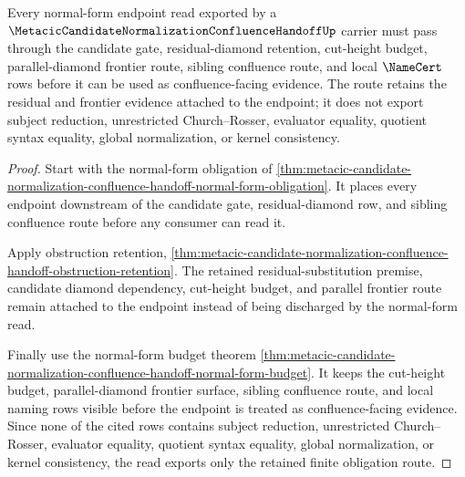\begin{theorem}
\label{thm:metacic-candidate-normalization-normal-form-obligation-route}
Every normal-form endpoint read exported by a
$\MetacicCandidateNormalizationConfluenceHandoffUp$ carrier must pass through
the candidate gate, residual-diamond retention, cut-height budget,
parallel-diamond frontier route, sibling confluence route, and local
$\NameCert$ rows before it can be used as confluence-facing evidence. The route
retains the residual and frontier evidence attached to the endpoint; it does not
export subject reduction, unrestricted Church--Rosser, evaluator equality,
quotient syntax equality, global normalization, or kernel consistency.
\end{theorem}
\begin{proof}
Start with the normal-form obligation of
\autoref{thm:metacic-candidate-normalization-confluence-handoff-normal-form-obligation}.
It places every endpoint downstream of the candidate gate, residual-diamond row,
and sibling confluence route before any consumer can read it.

Apply obstruction retention,
\autoref{thm:metacic-candidate-normalization-confluence-handoff-obstruction-retention}.
The retained residual-substitution premise, candidate diamond dependency,
cut-height budget, and parallel frontier route remain attached to the endpoint
instead of being discharged by the normal-form read.

Finally use the normal-form budget theorem
\autoref{thm:metacic-candidate-normalization-confluence-handoff-normal-form-budget}.
It keeps the cut-height budget, parallel-diamond frontier surface, sibling
confluence route, and local naming rows visible before the endpoint is treated
as confluence-facing evidence. Since none of the cited rows contains subject
reduction, unrestricted Church--Rosser, evaluator equality, quotient syntax
equality, global normalization, or kernel consistency, the read exports only
the retained finite obligation route.
\end{proof}

